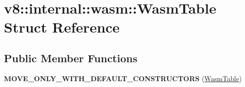 \hypertarget{structv8_1_1internal_1_1wasm_1_1WasmTable}{}\section{v8\+:\+:internal\+:\+:wasm\+:\+:Wasm\+Table Struct Reference}
\label{structv8_1_1internal_1_1wasm_1_1WasmTable}
\subsection*{Public Member Functions}
\begin{DoxyCompactItemize}
\item 
\mbox{\label{structv8_1_1internal_1_1wasm_1_1WasmTable_a11c08d86097f59ff41833a28f047c8cc}} 
{\bfseries M\+O\+V\+E\+\_\+\+O\+N\+L\+Y\+\_\+\+W\+I\+T\+H\+\_\+\+D\+E\+F\+A\+U\+L\+T\+\_\+\+C\+O\+N\+S\+T\+R\+U\+C\+T\+O\+RS} (\mbox{\hyperlink{structv8_1_1internal_1_1wasm_1_1WasmTable}{Wasm\+Table}})
\end{DoxyCompactItemize}
